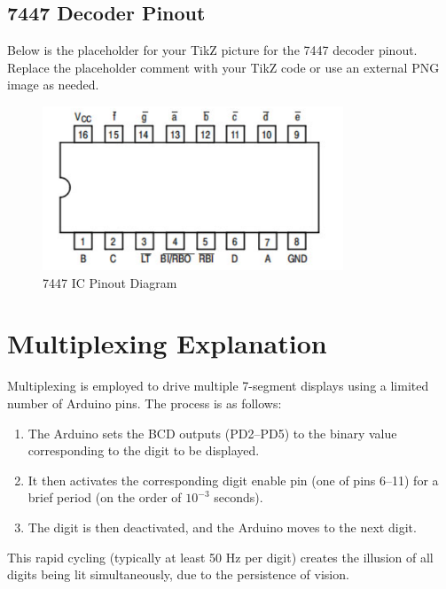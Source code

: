 \documentclass[a4paper,12pt]{article}
\begin{document}
\subsection{7447 Decoder Pinout}
Below is the placeholder for your TikZ picture for the 7447 decoder pinout. Replace the placeholder comment with your TikZ code or use an external PNG image as needed.
\begin{figure}[h]
    \centering
    
    
    \includegraphics[width=0.8\textwidth]{figs/7447_pinout.png}
    
    \caption{7447 IC Pinout Diagram}
    \label{fig:7447_pinout}
\end{figure}

\section{Multiplexing Explanation}
Multiplexing is employed to drive multiple 7-segment displays using a limited number of Arduino pins. The process is as follows:
\begin{enumerate}
    \item The Arduino sets the BCD outputs (PD2--PD5) to the binary value corresponding to the digit to be displayed.
    \item It then activates the corresponding digit enable pin (one of pins 6--11) for a brief period (on the order of $10^{-3}$ seconds).
    \item The digit is then deactivated, and the Arduino moves to the next digit.
\end{enumerate}
This rapid cycling (typically at least 50 Hz per digit) creates the illusion of all digits being lit simultaneously, due to the persistence of vision.
\end{document}

